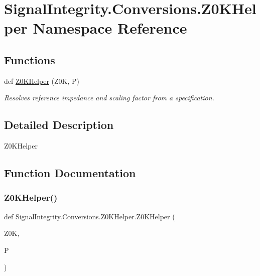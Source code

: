 \hypertarget{namespaceSignalIntegrity_1_1Conversions_1_1Z0KHelper}{}\section{Signal\+Integrity.\+Conversions.\+Z0\+K\+Helper Namespace Reference}
\label{namespaceSignalIntegrity_1_1Conversions_1_1Z0KHelper}
\subsection*{Functions}
\begin{DoxyCompactItemize}
\item 
def \hyperlink{namespaceSignalIntegrity_1_1Conversions_1_1Z0KHelper_a76cad84a212511d022296a6b35a63c29}{Z0\+K\+Helper} (Z0K, P)
\begin{DoxyCompactList}\small\item\em Resolves reference impedance and scaling factor from a specification. \end{DoxyCompactList}\end{DoxyCompactItemize}


\subsection{Detailed Description}
\begin{DoxyVerb}Z0KHelper\end{DoxyVerb}
 

\subsection{Function Documentation}
\mbox{\label{namespaceSignalIntegrity_1_1Conversions_1_1Z0KHelper_a76cad84a212511d022296a6b35a63c29}} 
\subsubsection{\texorpdfstring{Z0\+K\+Helper()}{Z0KHelper()}}
{\footnotesize\ttfamily def Signal\+Integrity.\+Conversions.\+Z0\+K\+Helper.\+Z0\+K\+Helper (\begin{DoxyParamCaption}\item[{}]{Z0K,  }\item[{}]{P }\end{DoxyParamCaption})}



